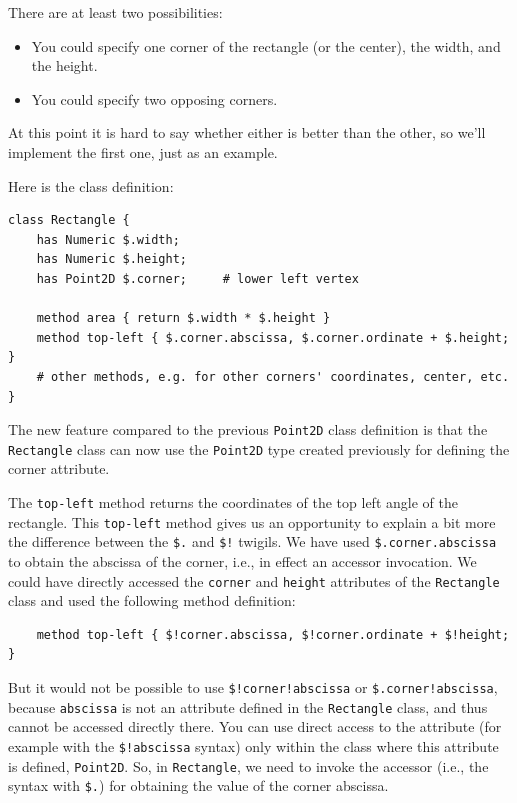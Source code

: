 There are at least two possibilities: 

\begin{itemize}

\item You could specify one corner of the rectangle
(or the center), the width, and the height.

\item You could specify two opposing corners.

\end{itemize}

At this point it is hard to say whether either is better than
the other, so we'll implement the first one, just as an example.

Here is the class definition:

\begin{verbatim}
class Rectangle {
    has Numeric $.width;
    has Numeric $.height;
    has Point2D $.corner;     # lower left vertex 

    method area { return $.width * $.height }
    method top-left { $.corner.abscissa, $.corner.ordinate + $.height; }
    # other methods, e.g. for other corners' coordinates, center, etc.
}
\end{verbatim}
%
The new feature compared to the previous {\tt Point2D} class 
definition is that the \verb'Rectangle' class can now use the 
{\tt Point2D} type created previously for defining the corner 
attribute. 

The {\tt top-left} method returns the coordinates of 
the top left angle of the rectangle. This {\tt top-left} 
method gives us an opportunity to explain a bit more 
the difference between the \verb'$.' and \verb'$!' twigils. We have 
used \verb'$.corner.abscissa' to obtain the abscissa of 
the corner, i.e., in effect an accessor invocation. We could 
have directly accessed the {\tt corner} and {\tt height} 
attributes of the {\tt Rectangle} class and used the following 
method definition:

\begin{verbatim}
    method top-left { $!corner.abscissa, $!corner.ordinate + $!height; }
\end{verbatim}

But it would not be possible to use \verb'$!corner!abscissa' or 
\verb'$.corner!abscissa', because {\tt abscissa} is not an 
attribute defined in the {\tt Rectangle} class, and thus cannot 
be accessed directly there. You can use direct access 
to the attribute (for example with the \verb'$!abscissa' syntax) 
only within the class where this attribute is defined, 
{\tt Point2D}. So, in {\tt Rectangle}, we need to invoke the 
accessor (i.e., the syntax with \verb'$.') for obtaining the 
value of the corner abscissa.

